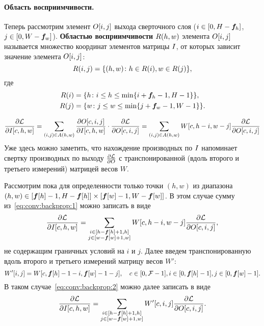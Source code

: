 \documentclass{book}
\numberwithin{theorem}{chapter}
\numberwithin{statement}{chapter}
\numberwithin{lemma}{chapter}
\theoremstyle{definition}
\numberwithin{task}{chapter}
\theoremstyle{remark}
\numberwithin{example}{chapter}
\theoremstyle{definition}
\numberwithin{definition}{chapter}
\theoremstyle{remark}
\theoremstyle{remark}
\numberwithin{lyrics}{section}
\begin{document}
\paragraph{Область восприимчивости.}
Теперь рассмотрим элемент $O[i, j]$ выхода сверточного слоя ($i \in [0, H - \boldsymbol{f}_h]$, $j \in [0, W - \boldsymbol{f}_w]$). \textbf{Областью восприимчивости} $R(h, w)$ элемента $O[i, j]$ называется множество координат элементов матрицы $I$, от которых зависит значение элемента $O[i, j]$:
\begin{equation}
\label{eq:receptive_field}
R(i, j) = \{(h, w) \colon h \in R(i), w \in R(j)\},
\end{equation}
где
\begin{align}
\label{eq:receptive_field:add}
R(i) &= \{h \colon i \le h \le \min\{i + \boldsymbol{f}_h - 1, H - 1\}\}, \\
R(j) &= \{w \colon j \le w \le \min\{j + \boldsymbol{f}_w - 1, W - 1\}\}.
\end{align}


\begin{equation}
\label{eq:conv:backprop:1}
\frac{\partial \mathcal{L} }{\partial I[c, h, w]}= \sum\limits_{(i, j) \in A(h, w)} 
\frac{\partial O[c, i, j] }{\partial I[c, h, w]} \cdot \frac{\partial \mathcal{L} }{\partial O[c, i, j]} = 
\sum\limits_{(i, j) \in A(h, w)} W[c, h - i, w - j] \frac{\partial \mathcal{L} }{\partial O[c, i, j]}
\end{equation}
Уже здесь можно заметить, что нахождение производных по $I$ напоминает свертку производных по выходу $\frac{\partial \mathcal{L} }{\partial O}$
с транспонированной (вдоль второго и третьего измерений) матрицей весов $W$.

Рассмотрим пока для определенности только точки $(h, w)$ из диапазона $(h, w) \in [\boldsymbol{f}[h] - 1, H - \boldsymbol{f}[h]] \times [\boldsymbol{f}[w] - 1, W - \boldsymbol{f}[w]]$. В этом случае сумму из~\eqref{eq:conv:backprop:1} можно записать в виде
\begin{equation}
\label{eq:conv:backprop:2}
\frac{\partial \mathcal{L} }{\partial I[c, h, w]} = \sum\limits_{\substack{i \in [h - \boldsymbol{f}[h] + 1, h] \\ j \in [w - \boldsymbol{f}[w] + 1, w]}} W[c, h - i, w - j] \frac{\partial \mathcal{L} }{\partial O[c, i, j]},
\end{equation}
не содержащим граничных условий на $i$ и $j$. Далее введем транспонированную вдоль второго и третьего измерений матрицу весов $W'$:
\begin{equation}
W'[i, j] = W[c, \boldsymbol{f}[h] - 1 - i, \boldsymbol{f}[w] - 1 - j], \quad c \in [0, \mathcal{F} - 1], i \in [0, \boldsymbol{f}[h] - 1], j \in [0, \boldsymbol{f}[w] - 1].
\end{equation}
В таком случае~\eqref{eq:conv:backprop:2} можно далее записать в виде
\begin{equation}
\frac{\partial \mathcal{L} }{\partial I[c, h, w]} = \sum\limits_{\substack{i \in [h - \boldsymbol{f}[h] + 1, h] \\ j \in [w - \boldsymbol{f}[w] + 1, w]}} W'[c, i, j] \frac{\partial \mathcal{L} }{\partial O[c, i, j]}.
\end{equation}
\end{document}
